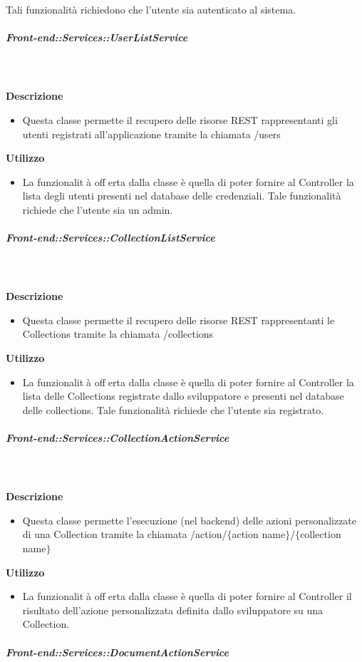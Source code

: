 \begin{itemize}
\begin{itemize}
Tali funzionalità richiedono che l'utente sia autenticato al sistema.
          \end{itemize}
      \subparagraph{Front-end::Services::UserListService}
        
        \textbf{\\ \\ Descrizione} 
          \begin{itemize}
            \item[] Questa classe permette il recupero delle risorse REST rappresentanti gli utenti registrati all'applicazione tramite la chiamata /users
          \end{itemize}      
        \textbf{Utilizzo}  
          \begin{itemize}
            \item[] La funzionalità offerta dalla classe è quella di poter fornire al Controller la lista degli utenti presenti nel database delle credenziali.
Tale funzionalità richiede che l'utente sia un admin.
          \end{itemize}
      \subparagraph{Front-end::Services::CollectionListService}
        
        \textbf{\\ \\ Descrizione} 
          \begin{itemize}
            \item[] Questa classe permette il recupero delle risorse REST rappresentanti le Collections tramite la chiamata /collections
          \end{itemize}      
        \textbf{Utilizzo}  
          \begin{itemize}
            \item[] La funzionalità offerta dalla classe è quella di poter fornire al Controller la lista delle Collections registrate dallo sviluppatore e presenti nel database delle collections.
Tale funzionalità richiede che l'utente sia registrato.
          \end{itemize}
      \subparagraph{Front-end::Services::CollectionActionService}
        
        \textbf{\\ \\ Descrizione} 
          \begin{itemize}
            \item[] Questa classe permette l'esecuzione (nel backend) delle azioni personalizzate di una Collection tramite la chiamata /action/$\{$action name$\}$/$\{$collection name$\}$
          \end{itemize}      
        \textbf{Utilizzo}  
          \begin{itemize}
            \item[] La funzionalità offerta dalla classe è quella di poter fornire al Controller il risultato dell'azione personalizzata definita dallo sviluppatore su una Collection.
          \end{itemize}
      \subparagraph{Front-end::Services::DocumentActionService}
        

\end{itemize}
